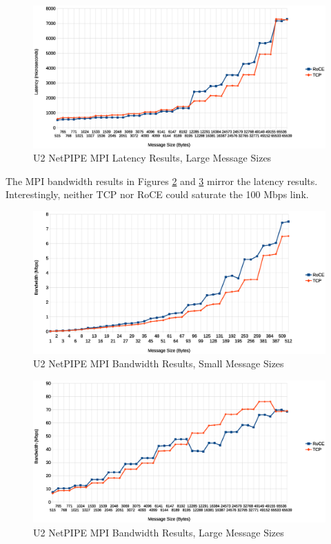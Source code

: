 \documentclass[11pt]{book}
\begin{document}
\begin{figure}
\includegraphics[width=\textwidth]{netpipe_lat_large}
\caption{U2 NetPIPE MPI Latency Results, Large Message Sizes}\label{npmpi-hlat}
\end{figure}

The MPI bandwidth results in Figures \ref{npmpi-lbw} and \ref{npmpi-hbw} mirror the
latency results.  Interestingly, neither TCP nor RoCE could saturate the 100 Mbps link.

\begin{figure}
\includegraphics[width=\textwidth]{netpipe_bw_small}
\caption{U2 NetPIPE MPI Bandwidth Results, Small Message Sizes}\label{npmpi-lbw}
\end{figure}

\begin{figure}
\includegraphics[width=\textwidth]{netpipe_bw_large}
\caption{U2 NetPIPE MPI Bandwidth Results, Large Message Sizes}\label{npmpi-hbw}
\end{figure}
\end{document}
